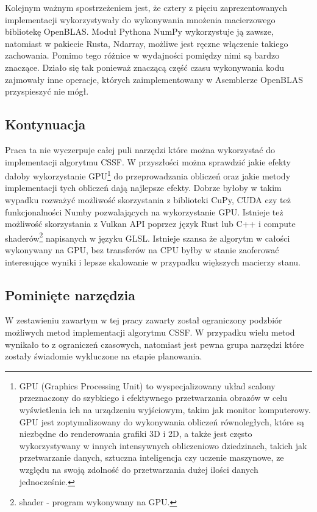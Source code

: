 \documentclass[11pt, a4paper]{article}
\begin{document}
\begin{sloppypar}
    Kolejnym ważnym spostrzeżeniem jest, że cztery z pięciu zaprezentowanych
    implementacji wykorzystywały do wykonywania mnożenia macierzowego bibliotekę
    OpenBLAS. Moduł Pythona NumPy wykorzystuje ją zawsze, natomiast w pakiecie Rusta, Ndarray,
    możliwe jest ręczne włączenie takiego zachowania. Pomimo tego różnice w wydajności pomiędzy
    nimi są bardzo znaczące. Działo się tak ponieważ znaczącą część czasu wykonywania
    kodu zajmowały inne operacje, których zaimplementowany w Asemblerze OpenBLAS przyspieszyć
    nie mógł.

    \subsection{Kontynuacja}
    Praca ta nie wyczerpuje całej puli narzędzi które można wykorzystać do implementacji
    algorytmu CSSF. W przyszłości można sprawdzić jakie efekty dałoby wykorzystanie GPU\footnote{GPU
    (Graphics Processing Unit) to wyspecjalizowany układ scalony przeznaczony do szybkiego
    i efektywnego przetwarzania obrazów w celu wyświetlenia ich na urządzeniu wyjściowym,
    takim jak monitor komputerowy. GPU jest zoptymalizowany do wykonywania obliczeń równoległych,
    które są niezbędne do renderowania grafiki 3D i 2D, a także jest często wykorzystywany
    w innych intensywnych obliczeniowo dziedzinach, takich jak przetwarzanie danych, sztuczna
    inteligencja czy uczenie maszynowe, ze względu na swoją zdolność do przetwarzania
    dużej ilości danych jednocześnie.} do przeprowadzania obliczeń oraz jakie metody
    implementacji tych obliczeń dają najlepsze efekty. Dobrze byłoby w takim wypadku rozważyć
    możliwość skorzystania z biblioteki CuPy, CUDA czy też funkcjonalności Numby
    pozwalających na wykorzystanie GPU. Istnieje też możliwość skorzystania z Vulkan API
    poprzez język Rust lub C++ i compute shaderów\footnote{shader - program wykonywany
    na GPU.} napisanych w języku GLSL. Istnieje szansa że algorytm w całości wykonywany na
    GPU, bez transferów na CPU byłby w stanie zaoferować interesujące wyniki i lepsze
    skalowanie w przypadku większych macierzy stanu.

    \subsection{Pominięte narzędzia}
    W zestawieniu zawartym w tej pracy zawarty został ograniczony podzbiór możliwych
    metod implementacji algorytmu CSSF. W przypadku wielu metod wynikało to z ograniczeń
    czasowych, natomiast jest pewna grupa narzędzi które zostały świadomie wykluczone na
    etapie planowania.


\end{sloppypar}
\end{document}
